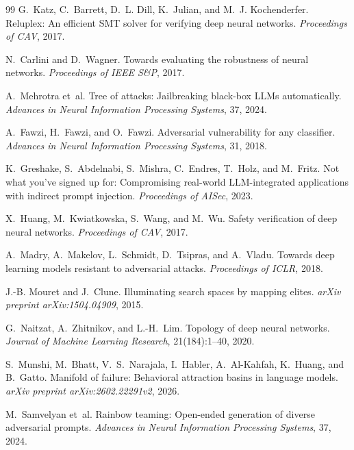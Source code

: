 \documentclass[11pt]{article}
\begin{document}
\begin{thebibliography}{99}
G.~Katz, C.~Barrett, D.~L. Dill, K.~Julian, and
M.~J. Kochenderfer.
\newblock Reluplex: An efficient {SMT} solver for verifying deep neural
  networks.
\newblock \emph{Proceedings of CAV}, 2017.

N.~Carlini and D.~Wagner.
\newblock Towards evaluating the robustness of neural networks.
\newblock \emph{Proceedings of IEEE S\&P}, 2017.

A.~Mehrotra et~al.
\newblock Tree of attacks: Jailbreaking black-box {LLMs} automatically.
\newblock \emph{Advances in Neural Information Processing Systems}, 37,
2024.

A.~Fawzi, H.~Fawzi, and O.~Fawzi.
\newblock Adversarial vulnerability for any classifier.
\newblock \emph{Advances in Neural Information Processing Systems}, 31, 2018.

K.~Greshake, S.~Abdelnabi, S.~Mishra, C.~Endres, T.~Holz, and M.~Fritz.
\newblock Not what you've signed up for: Compromising real-world
  {LLM}-integrated applications with indirect prompt injection.
\newblock \emph{Proceedings of AISec}, 2023.

X.~Huang, M.~Kwiatkowska, S.~Wang, and M.~Wu.
\newblock Safety verification of deep neural networks.
\newblock \emph{Proceedings of CAV}, 2017.

A.~Madry, A.~Makelov, L.~Schmidt, D.~Tsipras, and A.~Vladu.
\newblock Towards deep learning models resistant to adversarial attacks.
\newblock \emph{Proceedings of ICLR}, 2018.

J.-B. Mouret and J.~Clune.
\newblock Illuminating search spaces by mapping elites.
\newblock \emph{arXiv preprint arXiv:1504.04909}, 2015.

G.~Naitzat, A.~Zhitnikov, and L.-H.~Lim.
\newblock Topology of deep neural networks.
\newblock \emph{Journal of Machine Learning Research}, 21(184):1--40, 2020.

S.~Munshi, M.~Bhatt, V.~S.~Narajala, I.~Habler, A.~Al-Kahfah,
K.~Huang, and B.~Gatto.
\newblock Manifold of failure: Behavioral attraction basins in language
  models.
\newblock \emph{arXiv preprint arXiv:2602.22291v2}, 2026.

M.~Samvelyan et~al.
\newblock Rainbow teaming: Open-ended generation of diverse adversarial
  prompts.
\newblock \emph{Advances in Neural Information Processing Systems}, 37,
2024.


\end{thebibliography}
\end{document}
